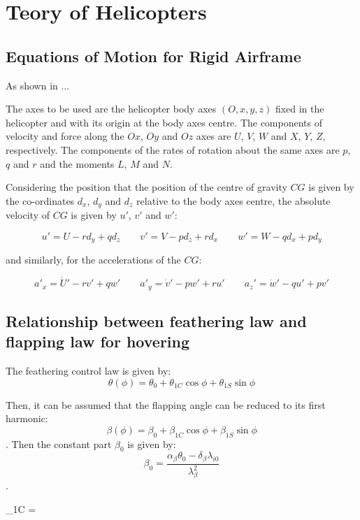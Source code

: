 \section{Teory of Helicopters}

\subsection{Equations of Motion for Rigid Airframe}

  As shown in \cite{Cooke}...

  The axes to be used are the helicopter body axes $(O,x,y,z)$ fixed in the helicopter and with its origin at the body axes centre. The components of velocity and force along the $Ox$, $Oy$ and $Oz$ axes are $U$, $V$, $W$ and $X$, $Y$, $Z$, respectively. The components of the rates of rotation about the same axes are $p$, $q$ and $r$ and the moments $L$, $M$ and $N$.

  Considering the position that the position of the centre of gravity $CG$ is given by the co-ordinates $d_x$, $d_y$ and $d_z$ relative to the body axes centre, the absolute velocity of $CG$ is given by $u'$, $v'$ and $w'$:

  \begin{equation}
  	u' = U - r d_y + q d_z \qquad v' = V - p d_z + r d_x \qquad w' = W - q d_x + p d_y
  \end{equation}

  \noindent
  and similarly, for the accelerations of the $CG$:

  \begin{equation}
  	a'_x = \dot{U}' - r v' + q w' \qquad a'_y = \dot{v}' - p w' + r u' \qquad a_z' = \dot{w}' - q u' + p v'
  \end{equation}

\subsection{Relationship between feathering law and flapping law for hovering}
  
  The feathering control law is given by: $$ \theta(\phi) = \theta_0 + \theta_{1C}\cos{\phi} + \theta_{1S}\sin{\phi}$$

  Then, it can be assumed that the flapping angle can be reduced to its first harmonic: $$\beta(\phi) = \beta_0 + \beta_{1C}\cos{\phi} + \beta_{1S}\sin{\phi}$$. Then the constant part $\beta_0$ is given by: $$\beta_0 = \frac{\alpha_\beta \theta_0 - \delta_\beta \lambda_{i0}}{\lambda_\beta^2}$$.

  \begin{eqarray}
    \beta_{1C} = 
  \end{eqarray}